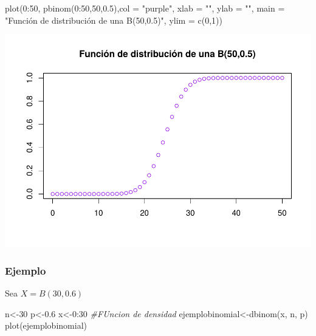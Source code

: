 \documentclass[
]{article}
\newenvironment{Shaded}{\begin{snugshade}}{\end{snugshade}}
\newcommand{\AttributeTok}[1]{\textcolor[rgb]{0.77,0.63,0.00}{#1}}
\newcommand{\CommentTok}[1]{\textcolor[rgb]{0.56,0.35,0.01}{\textit{#1}}}
\newcommand{\DecValTok}[1]{\textcolor[rgb]{0.00,0.00,0.81}{#1}}
\newcommand{\FloatTok}[1]{\textcolor[rgb]{0.00,0.00,0.81}{#1}}
\newcommand{\FunctionTok}[1]{\textcolor[rgb]{0.00,0.00,0.00}{#1}}
\newcommand{\NormalTok}[1]{#1}
\newcommand{\OtherTok}[1]{\textcolor[rgb]{0.56,0.35,0.01}{#1}}
\newcommand{\SpecialCharTok}[1]{\textcolor[rgb]{0.00,0.00,0.00}{#1}}
\newcommand{\StringTok}[1]{\textcolor[rgb]{0.31,0.60,0.02}{#1}}
\begin{document}
\begin{Shaded}
\begin{Highlighting}[]
\FunctionTok{plot}\NormalTok{(}\DecValTok{0}\SpecialCharTok{:}\DecValTok{50}\NormalTok{, }\FunctionTok{pbinom}\NormalTok{(}\DecValTok{0}\SpecialCharTok{:}\DecValTok{50}\NormalTok{,}\DecValTok{50}\NormalTok{,}\FloatTok{0.5}\NormalTok{),}\AttributeTok{col =} \StringTok{"purple"}\NormalTok{, }\AttributeTok{xlab =} \StringTok{""}\NormalTok{, }\AttributeTok{ylab =} \StringTok{""}\NormalTok{, }\AttributeTok{main =} \StringTok{"Función de distribución de una B(50,0.5)"}\NormalTok{, }\AttributeTok{ylim =} \FunctionTok{c}\NormalTok{(}\DecValTok{0}\NormalTok{,}\DecValTok{1}\NormalTok{))}
\end{Highlighting}
\end{Shaded}

\includegraphics{Teoria4_files/figure-latex/Ejemplos de distribucion binomial-2.pdf}

\hypertarget{ejemplo}{%
\subsubsection{Ejemplo}\label{ejemplo}}

Sea \(X = B(30, 0.6)\)

\begin{Shaded}
\begin{Highlighting}[]
\NormalTok{n}\OtherTok{\textless{}{-}}\DecValTok{30}
\NormalTok{p}\OtherTok{\textless{}{-}}\FloatTok{0.6}
\NormalTok{x}\OtherTok{\textless{}{-}}\DecValTok{0}\SpecialCharTok{:}\DecValTok{30}
\CommentTok{\#FUncion de densidad}
\NormalTok{ejemplobinomial}\OtherTok{\textless{}{-}}\FunctionTok{dbinom}\NormalTok{(x, n, p)}
\FunctionTok{plot}\NormalTok{(ejemplobinomial)}
\end{Highlighting}
\end{Shaded}
\end{document}
